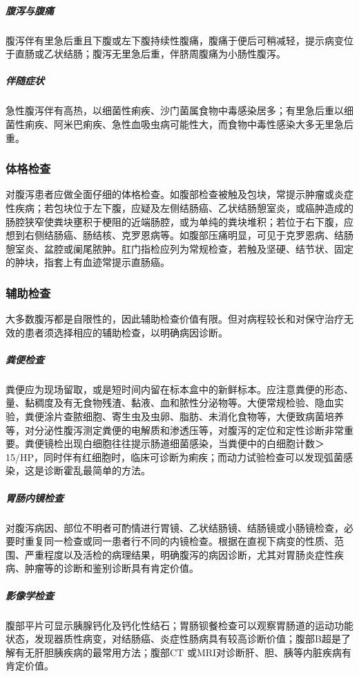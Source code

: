 \subparagraph{腹泻与腹痛}

腹泻伴有里急后重且下腹或左下腹持续性腹痛，腹痛于便后可稍减轻，提示病变位于直肠或乙状结肠；腹泻无里急后重，伴脐周腹痛为小肠性腹泻。

\subparagraph{伴随症状}

急性腹泻伴有高热，以细菌性痢疾、沙门菌属食物中毒感染居多；有里急后重以细菌性痢疾、阿米巴痢疾、急性血吸虫病可能性大，而食物中毒性感染大多无里急后重。

\subsubsection{体格检查}

对腹泻患者应做全面仔细的体格检查。如腹部检查被触及包块，常提示肿瘤或炎症性疾病；若包块位于左下腹，应疑及左侧结肠癌、乙状结肠憩室炎，或癌肿造成的肠腔狭窄使粪块壅积于梗阻的近端肠腔，或为单纯的粪块堆积；若位于右下腹，应想到右侧结肠癌、肠结核、克罗恩病等。如腹部压痛明显，可见于克罗恩病、结肠憩室炎、盆腔或阑尾脓肿。肛门指检应列为常规检查，若触及坚硬、结节状、固定的肿块，指套上有血迹常提示直肠癌。

\subsubsection{辅助检查}

大多数腹泻都是自限性的，因此辅助检查价值有限。但对病程较长和对保守治疗无效的患者须选择相应的辅助检查，以明确病因诊断。

\subparagraph{粪便检查}

粪便应为现场留取，或是短时间内留在标本盒中的新鲜标本。应注意粪便的形态、量、黏稠度及有无食物残渣、黏液、血和脓性分泌物等。大便常规检验、隐血实验，粪便涂片查脓细胞、寄生虫及虫卵、脂肪、未消化食物等，大便致病菌培养等，对分泌性腹泻测定粪便的电解质和渗透压等，对腹泻的定位和定性诊断非常重要。粪便镜检出现白细胞往往提示肠道细菌感染，当粪便中的白细胞计数＞
15/HP，同时伴有红细胞时，临床可诊断为痢疾；而动力试验检查可以发现弧菌感染，这是诊断霍乱最简单的方法。

\subparagraph{胃肠内镜检查}

对腹泻病因、部位不明者可酌情进行胃镜、乙状结肠镜、结肠镜或小肠镜检查，必要时重复同一检查或同一患者行不同的内镜检查。根据在直视下病变的性质、范围、严重程度以及活检的病理结果，明确腹泻的病因诊断，尤其对胃肠炎症性疾病、肿瘤等的诊断和鉴别诊断具有肯定价值。

\subparagraph{影像学检查}

腹部平片可显示胰腺钙化及钙化性结石；胃肠钡餐检查可以观察胃肠道的运动功能状态，发现器质性病变，对结肠癌、炎症性肠病具有较高诊断价值；腹部B超是了解有无肝胆胰疾病的最常用方法；腹部CT
或MRI对诊断肝、胆、胰等内脏疾病有肯定价值。

